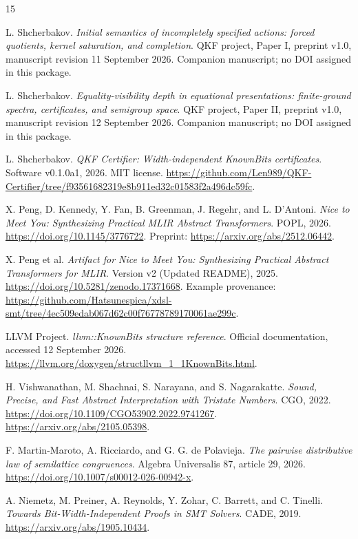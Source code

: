 \begin{thebibliography}{15}

L. Shcherbakov.
\emph{Initial semantics of incompletely specified actions: forced quotients, kernel saturation, and completion}.
QKF project, Paper I, preprint v1.0, manuscript revision 11 September 2026. Companion manuscript; no DOI assigned in this package.

L. Shcherbakov.
\emph{Equality-visibility depth in equational presentations: finite-ground spectra, certificates, and semigroup space}.
QKF project, Paper II, preprint v1.0, manuscript revision 12 September 2026. Companion manuscript; no DOI assigned in this package.

L. Shcherbakov.
\emph{QKF Certifier: Width-independent KnownBits certificates}.
Software v0.1.0a1, 2026. MIT license.
\url{https://github.com/Len989/QKF-Certifier/tree/f93561682319e8b911ed32c01583f2a496dc59fc}.

X. Peng, D. Kennedy, Y. Fan, B. Greenman, J. Regehr, and L. D'Antoni.
\emph{Nice to Meet You: Synthesizing Practical MLIR Abstract Transformers}.
POPL, 2026. \url{https://doi.org/10.1145/3776722}.
Preprint: \url{https://arxiv.org/abs/2512.06442}.

X. Peng et al.
\emph{Artifact for Nice to Meet You: Synthesizing Practical Abstract Transformers for MLIR}.
Version v2 (Updated README), 2025.
\url{https://doi.org/10.5281/zenodo.17371668}.
Example provenance: \url{https://github.com/Hatsunespica/xdsl-smt/tree/4ec509edab067d62c00f76778789170061ae299c}.

LLVM Project.
\emph{llvm::KnownBits structure reference}.
Official documentation, accessed 12 September 2026.
\url{https://llvm.org/doxygen/structllvm_1_1KnownBits.html}.

H. Vishwanathan, M. Shachnai, S. Narayana, and S. Nagarakatte.
\emph{Sound, Precise, and Fast Abstract Interpretation with Tristate Numbers}.
CGO, 2022. \url{https://doi.org/10.1109/CGO53902.2022.9741267}.
\url{https://arxiv.org/abs/2105.05398}.

F. Martin-Maroto, A. Ricciardo, and G. G. de Polavieja.
\emph{The pairwise distributive law of semilattice congruences}.
Algebra Universalis 87, article 29, 2026.
\url{https://doi.org/10.1007/s00012-026-00942-x}.

A. Niemetz, M. Preiner, A. Reynolds, Y. Zohar, C. Barrett, and C. Tinelli.
\emph{Towards Bit-Width-Independent Proofs in SMT Solvers}.
CADE, 2019. \url{https://arxiv.org/abs/1905.10434}.


\end{thebibliography}
